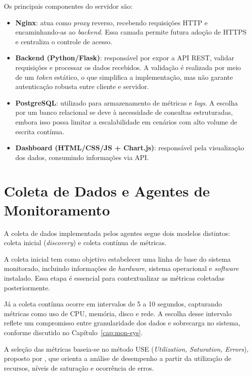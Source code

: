 \documentclass[
    12pt
    ,oneside
    ,a4paper
    ,chapter=TITLE
    ,section=TITLE
    ,sumario=abnt-6027-2012]{abntex2}
\begin{document}
Os principais componentes do servidor são:

\begin{itemize}
    \item \textbf{Nginx}: atua como \textit{proxy} reverso, recebendo requisições HTTP e encaminhando‑as ao \textit{backend}. Essa camada permite futura adoção de HTTPS e centraliza o controle de acesso.
    \item \textbf{Backend (Python/Flask)}: responsável por expor a API REST, validar requisições e processar os dados recebidos. A validação é realizada por meio de um \textit{token} estático, o que simplifica a implementação, mas não garante autenticação robusta entre cliente e servidor.
    \item \textbf{PostgreSQL}: utilizado para armazenamento de métricas e \textit{logs}. A escolha por um banco relacional se deve à necessidade de consultas estruturadas, embora isso possa limitar a escalabilidade em cenários com alto volume de escrita contínua.
    \item \textbf{Dashboard (HTML/CSS/JS + Chart.js)}: responsável pela visualização dos dados, consumindo informações via API.
\end{itemize}

\section{Coleta de Dados e Agentes de Monitoramento}

A coleta de dados implementada pelos agentes segue dois modelos distintos: coleta inicial (\textit{discovery}) e coleta contínua de métricas.

A coleta inicial tem como objetivo estabelecer uma linha de base do sistema monitorado, incluindo informações de \textit{hardware}, sistema operacional e \textit{software} instalado. Essa etapa é essencial para contextualizar as métricas coletadas posteriormente.

Já a coleta contínua ocorre em intervalos de 5 a 10 segundos, capturando métricas como uso de CPU, memória, disco e rede. A escolha desse intervalo reflete um compromisso entre granularidade dos dados e sobrecarga no sistema, conforme discutido no Capítulo~\ref{cap:mon-sys}.

A seleção das métricas baseia-se no método USE (\textit{Utilization, Saturation, Errors}), proposto por , que orienta a análise de desempenho a partir da utilização de recursos, níveis de saturação e ocorrência de erros.
\end{document}
